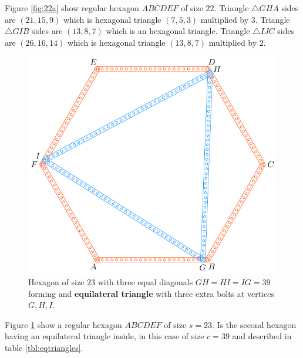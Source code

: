 \documentclass[11pt]{article}
\begin{document}
Figure \ref{fig:22a} show regular hexagon $ABCDEF$ of size $22$. Triangle $\triangle{GHA}$ sides are $(21,15,9)$ which is hexagonal triangle $(7,5,3)$ multiplied by $3$. Triangle $\triangle{GIB}$ sides are $(13,8,7)$ which is an hexagonal triangle. Triangle $\triangle{IJC}$ sides are $(26,16,14)$ which is hexagonal triangle $(13,8,7)$ multiplied by $2$.

\begin{figure}[H]
\centering
\includegraphics[scale=0.9]{23/hexa-23a}
\caption{Hexagon of size $23$ with three equal diagonals $\overline{GH} = \overline{HI} = \overline{IG} = 39$ forming and \textbf{equilateral triangle} with three extra bolts at vertices $G,H,I$.}
\label{fig:23a}
\end{figure}

Figure \ref{fig:23a} show a regular hexagon $ABCDEF$ of size $s=23$. Is the second hexagon having an equilateral triangle inside, in this case of size $c=39$ and described in table \ref{tbl:eqtriangles}.
\end{document}
